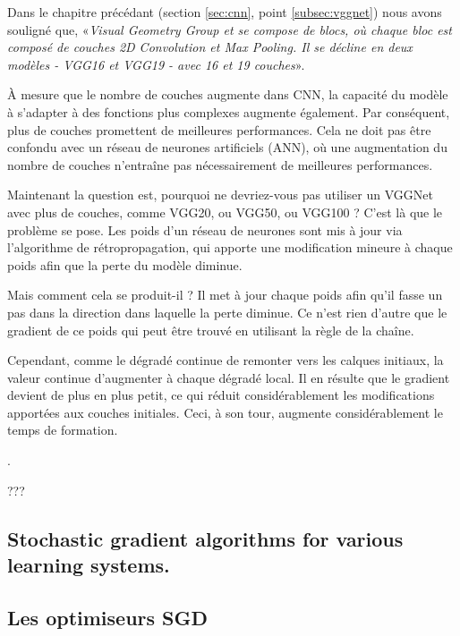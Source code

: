 	
	
	Dans le chapitre précédant (section \ref{sec:cnn}, point \ref{subsec:vggnet}) nous avons souligné que, «\textit{Visual Geometry Group et se compose de blocs, où chaque bloc est composé de couches 2D Convolution et Max Pooling. Il se décline en deux modèles - VGG16 et VGG19 - avec 16 et 19 couches}».
	
	À mesure que le nombre de couches augmente dans CNN, la capacité du modèle à s'adapter à des fonctions plus complexes augmente également. Par conséquent, plus de couches promettent de meilleures performances. Cela ne doit pas être confondu avec un réseau de neurones artificiels (ANN), où une augmentation du nombre de couches n'entraîne pas nécessairement de meilleures performances.
	
	Maintenant la question est, pourquoi ne devriez-vous pas utiliser un VGGNet avec plus de couches, comme VGG20, ou VGG50, ou VGG100 ? C'est là que le problème se pose. Les poids d'un réseau de neurones sont mis à jour via l'algorithme de rétropropagation, qui apporte une modification mineure à chaque poids afin que la perte du modèle diminue.
	
	Mais comment cela se produit-il ? Il met à jour chaque poids afin qu'il fasse un pas dans la direction dans laquelle la perte diminue. Ce n'est rien d'autre que le gradient de ce poids qui peut être trouvé en utilisant la règle de la chaîne.
	
	Cependant, comme le dégradé continue de remonter vers les calques initiaux, la valeur continue d'augmenter à chaque dégradé local. Il en résulte que le gradient devient de plus en plus petit, ce qui réduit considérablement les modifications apportées aux couches initiales. Ceci, à son tour, augmente considérablement le temps de formation.
	
	
	\cite{bottou2018optimization, antoine2018apprentissage}.
	
	???
	
	\subsection{Stochastic gradient algorithms for various learning systems.}
	
	
	\subsection{Les optimiseurs SGD}
	\lipsum[1]
